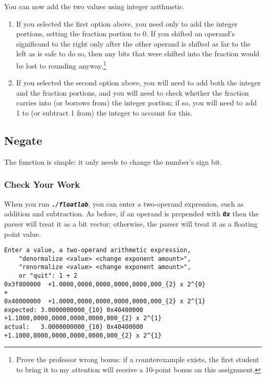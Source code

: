 You can now add the two values using integer arithmetic.

\begin{enumerate}
    \item If you selected the first option above, you need only to add the integer portions, setting the fraction portion to 0.
        If you shifted an operand's significand to the right only after the other operand is shifted as far to the left as is safe to do so, then any bits that were shifted into the fraction would be lost to rounding anyway.\footnote{
            Prove the professor wrong bonus: if a counterexample exists, the first student to bring it to my attention will receive a 10-point bonus on this assignment.
        }
    \item If you selected the second option above, you will need to add both the integer and the fraction portions,
        and you will need to check whether the fraction carries into (or borrows from) the integer portion;
        if so, you will need to add 1 to (or subtract 1 from) the integer to account for this.
\end{enumerate}

\subsection{Negate}

The  function is simple: it only needs to change the number's sign bit.

\subsubsection*{Check Your Work}

When you run \texttt{\textbf{\textit{./floatlab}}}, you can enter a two-operand expression, such as addition and subtraction.
As before, if an operand is prepended with \texttt{\textbf{\textit{0x}}} then the parser will treat it as a bit vector;
otherwise, the parser will treat it as a floating point value.

\begin{verbatim}
Enter a value, a two-operand arithmetic expression,
    "denormalize <value> <change exponent amount>",
    "renormalize <value> <change exponent amount>",
    or "quit": 1 + 2
0x3f800000	+1.0000,0000,0000,0000,0000,000_{2} x 2^{0}
+
0x40000000	+1.0000,0000,0000,0000,0000,000_{2} x 2^{1}
expected: 3.0000000000_{10}	0x40400000	+1.1000,0000,0000,0000,0000,000_{2} x 2^{1}
actual:   3.0000000000_{10}	0x40400000	+1.1000,0000,0000,0000,0000,000_{2} x 2^{1}
\end{verbatim}

